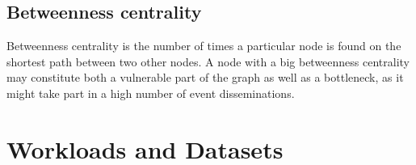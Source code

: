 \subsection{Betweenness centrality}
Betweenness centrality is the number of times a particular node
is found on the shortest path between two other nodes. A node
with a big betweenness centrality may constitute both a
vulnerable part of the graph as well as a bottleneck, as it
might take part in a high number of event disseminations.


\section{Workloads and Datasets}
